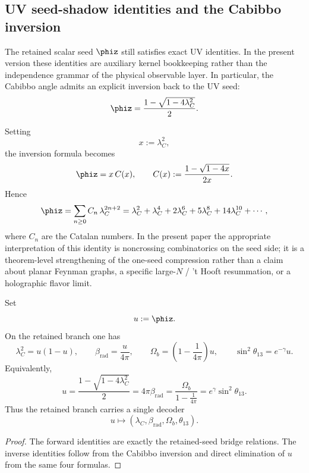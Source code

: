 \subsection{UV seed-shadow identities and the Cabibbo inversion}

The retained scalar seed $\phiz$ still satisfies exact UV identities. In the present version these
identities are auxiliary kernel bookkeeping rather than the independence grammar of the physical
observable layer. In particular, the Cabibbo angle admits an explicit inversion back to the UV
seed:
\begin{equation}
\label{eq:cabibbo-inversion}
\phiz=\frac{1-\sqrt{1-4\lambda_C^2}}{2}.
\end{equation}
\begin{remark}
Setting
\[
x:=\lambda_C^2,
\]
the inversion formula becomes
\[
\phiz=x\,C(x),
\qquad
C(x):=\frac{1-\sqrt{1-4x}}{2x}.
\]
Hence
\begin{equation}
\label{eq:catalan-cabibbo}
\phiz
=
\sum_{n\ge 0} C_n\,\lambda_C^{2n+2}
=
\lambda_C^2+\lambda_C^4+2\lambda_C^6+5\lambda_C^8+14\lambda_C^{10}+\cdots,
\end{equation}
where $C_n$ are the Catalan numbers. In the present paper the appropriate interpretation of this
identity is noncrossing combinatorics on the seed side; it is a theorem-level strengthening of
the one-seed compression rather than a claim about planar Feynman graphs, a specific large-$N$ /
't Hooft resummation, or a holographic flavor limit.
\end{remark}

\begin{proposition}
\label{prop:retained-seed-decoder}
Set
\[
u:=\phiz.
\]
On the retained branch one has
\[
\lambda_C^2=u(1-u),
\qquad
\beta_{\mathrm{rad}}=\frac{u}{4\pi},
\qquad
\Omega_b=\left(1-\frac{1}{4\pi}\right)u,
\qquad
\sin^2\theta_{13}=e^{-\gamma}u.
\]
Equivalently,
\[
u
=
\frac{1-\sqrt{1-4\lambda_C^2}}{2}
=
4\pi\beta_{\mathrm{rad}}
=
\frac{\Omega_b}{1-\frac{1}{4\pi}}
=
e^\gamma\sin^2\theta_{13}.
\]
Thus the retained branch carries a single decoder
\[
u\longmapsto (\lambda_C,\beta_{\mathrm{rad}},\Omega_b,\theta_{13}).
\]
\end{proposition}

\begin{proof}
The forward identities are exactly the retained-seed bridge relations. The inverse identities follow
from the Cabibbo inversion  and direct elimination of $u$ from the same
four formulas.
\end{proof}

